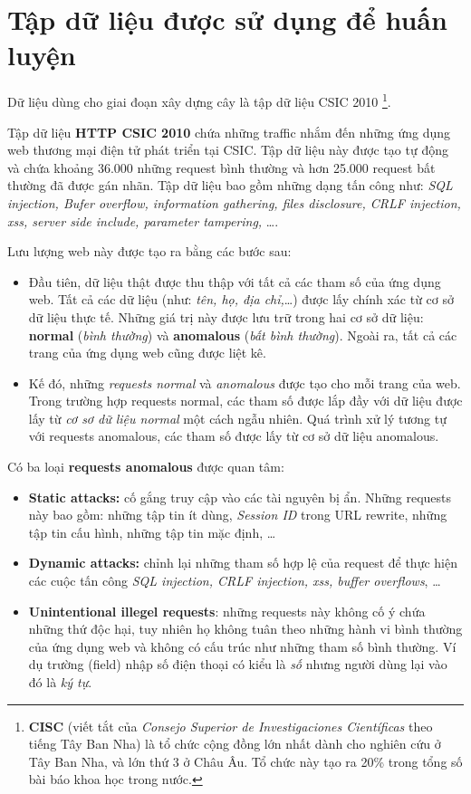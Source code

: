 \documentclass[../main-report.tex]{subfiles}
\begin{document}
\section{Tập dữ liệu được sử dụng để huấn luyện}
Dữ liệu dùng cho giai đoạn xây dựng cây là tập dữ liệu CSIC 2010 \footnote{\textbf{CISC} (viết tắt của \emph{Consejo Superior de Investigaciones Científicas} theo tiếng Tây Ban Nha) là tổ chức cộng đồng lớn nhất dành cho nghiên cứu ở Tây Ban Nha, và lớn thứ 3 ở Châu Âu. Tổ chức này tạo ra 20\% trong tổng số bài báo khoa học trong nước.}.

Tập dữ liệu \textbf{HTTP CSIC 2010} chứa những traffic nhắm đến những ứng dụng web thương mại điện tử phát triển tại CSIC. Tập dữ liệu này được tạo tự động và chứa khoảng 36.000 những request bình thường và hơn 25.000 request bất thường đã được gán nhãn. Tập dữ liệu bao gồm những dạng tấn công như: \emph{SQL injection, Bufer overflow, information gathering, files disclosure, CRLF injection, \acrshort{xss}, server side include, parameter tampering,} \ldots.

Lưu lượng web này được tạo ra bằng các bước sau:

\begin{itemize}
\item Đầu tiên, dữ liệu thật được thu thập với tất cả các tham số của ứng dụng web. Tất cả các dữ liệu (như: \emph{tên, họ, địa chỉ,}\ldots) được lấy chính xác từ cơ sở dữ liệu thực tế. Những giá trị này được lưu trữ trong hai cơ sở dữ liệu: \textbf{normal} (\emph{bình thường}) và \textbf{anomalous} (\emph{bất bình thường}). Ngoài ra, tất cả các trang của ứng dụng web cũng được liệt kê.

\item Kế đó, những \emph{requests normal} và \emph{anomalous} được tạo cho mỗi trang của web. Trong trường hợp requests normal, các tham số được lắp đầy với dữ liệu được lấy từ \emph{cơ sơ dữ liệu normal} một cách ngẫu nhiên. Quá trình xử lý tương tự với requests anomalous, các tham số được lấy từ cơ sở dữ liệu anomalous.
\end{itemize}

Có ba loại \textbf{requests anomalous} được quan tâm:

\begin{itemize}
\item \textbf{Static attacks:} cố gắng truy cập vào các tài nguyên bị ẩn. Những requests này bao gồm: những tập tin ít dùng, \emph{Session ID} trong URL rewrite, những tập tin cấu hình, những tập tin mặc định, \ldots
\item \textbf{Dynamic attacks:} chỉnh lại những tham số hợp lệ của request để thực hiện các cuộc tấn công \emph{SQL injection, CRLF injection, \acrshort{xss}, buffer overflows}, \ldots
\item \textbf{Unintentional illegel requests}: những requests này không cố ý chứa những thứ độc hại, tuy nhiên họ không tuân theo những hành vi bình thường của ứng dụng web và không có cấu trúc như những tham số bình thường. Ví dụ trường (field) nhập số điện thoại có kiểu là \emph{số} nhưng người dùng lại vào đó là \emph{ký tự}.
\end{itemize}
\end{document}
